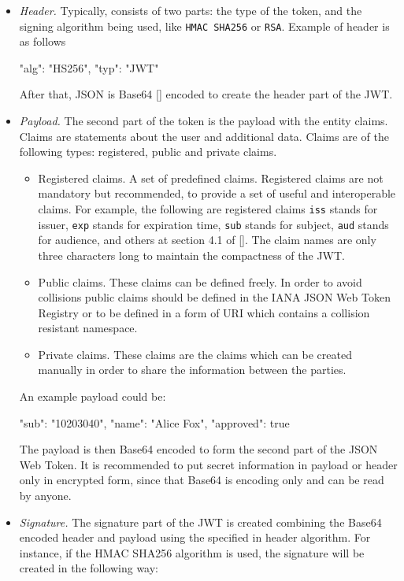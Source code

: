 \begin{itemize}
    \item \textit{Header.} Typically, consists of two parts: the type of the token, and the signing algorithm
    being used, like \texttt{HMAC SHA256} or \texttt{RSA}.
    Example of header is as follows

    \begin{spverbatim}
    {
        "alg": "HS256",
        "typ": "JWT"
    }
    \end{spverbatim}

    After that, JSON is Base64 [\cite{josefsson2003rfc3548}] encoded to create the header part of the JWT\@.
    \item \textit{Payload.} The second part of the token is the payload with the entity claims.
    Claims are statements about the user and additional data.
    Claims are of the following types: registered, public and private claims.
    \begin{itemize}
        \item Registered claims.
        A set of predefined claims.
        Registered claims are not mandatory but recommended, to provide a set of useful and interoperable claims.
        For example, the following are registered claims
        \texttt{iss} stands for issuer,
        \texttt{exp} stands for expiration time,
        \texttt{sub} stands for subject,
        \texttt{aud} stands for audience,
        and others at section 4.1 of [\cite{jones2015rfc}].
        The claim names are only three characters long to maintain the compactness of the JWT\@.
        \item Public claims.
        These claims can be defined freely.
        In order to avoid collisions public claims should be defined in the IANA JSON Web Token Registry
        or to be defined in a form of URI which contains a collision resistant namespace.
        \item Private claims.
        These claims are the claims which can be created manually in order to share
        the information between the parties.
    \end{itemize}
    An example payload could be:

    \begin{spverbatim}
    {
        "sub": "10203040",
        "name": "Alice Fox",
        "approved": true
    }
    \end{spverbatim}

    The payload is then Base64 encoded to form the second part of the JSON Web Token.
    It is recommended to put secret information in payload or header only in encrypted form, since that Base64 is encoding
    only and can be read by anyone.
    \item \textit{Signature.} The signature part of the JWT is created combining the Base64 encoded
    header and payload using the specified in header algorithm.
    For instance, if the HMAC SHA256 algorithm is used, the signature will be created in the following way:


\end{itemize}
